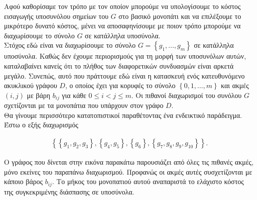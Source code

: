 \documentclass[oneside,12pt]{book}
\theoremstyle{definition}
\begin{document}
Αφού καθορίσαμε τον τρόπο με τον οποίον μπορούμε να υπολογίσουμε το κόστος εισαγωγής υποσυνόλου σημείων του \(G\) στο βασικό μονοπάτι και να επιλέξουμε το μικρότερο δυνατό κόστος, μένει να αποσαφηνίσουμε με ποιον τρόπο μπορούμε να διαχωρίσουμε το σύνολο \(G\) σε κατάλληλα υποσύνολα. \\

Στόχος εδώ είναι να διαχωρίσουμε το σύνολο \(G = \left\{g_1,...,g_m\right\}\) σε κατάλληλα υποσύνολα. Καθώς δεν έχουμε περιορισμούς για τη μορφή των υποσυνόλων αυτών, καταλαβαίνει κανείς ότι το πλήθος των διαφορετικών συνδυασμών είναι αρκετά μεγάλο. Συνεπώς, αυτό που πράττουμε εδώ είναι η κατασκευή ενός κατευθυνόμενο ακυκλικού γράφου \(D\), ο οποίος έχει για κορυφές το σύνολο \(\left\{0,1,...,m\right\}\) και ακμές \((i,j)\) με βάρη \(b_{ij}\) για κάθε \(0 \leq i < j \leq m\). Οι πιθανοί διαχωρισμοί του συνόλου \(G\) σχετίζονται με τα μονοπάτια που υπάρχουν στον γράφο \(D\). \\

Θα γίνουμε περισσότερο κατατοπιστικοί παραθέτοντας ένα ενδεικτικό παράδειγμα. Έστω ο εξής διαχωρισμός 

\begin{align*}
	\left\{ \left\{ g_1,g_2,g_3 \right\}, \left\{ g_4,g_5 \right\}, \left\{ g_6 \right\}, \left\{ g_7,g_8,g_9, g_{10} \right\}\right\}.
\end{align*}

Ο γράφος που δίνεται στην εικόνα παρακάτω παρουσιάζει από όλες τις πιθανές ακμές, μόνο εκείνες του παραπάνω διαχωρισμού. Προφανώς οι ακμές αυτές συσχετίζονται με κάποιο βάρος \(b_{ij}\). Το μήκος του μονοπατιού αυτού αναπαριστά το ελάχιστο κόστος της συγκεκριμένης διάσπασης σε υποσύνολα.\\
\end{document}

